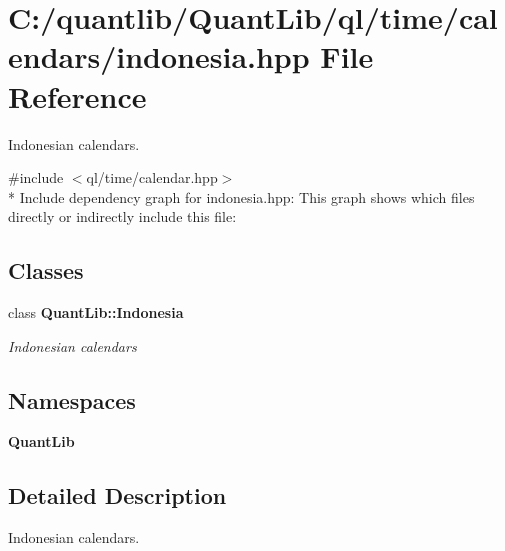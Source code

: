 \section{C\+:/quantlib/\+Quant\+Lib/ql/time/calendars/indonesia.hpp File Reference}
\label{indonesia_8hpp}


Indonesian calendars.  


{\ttfamily \#include $<$ql/time/calendar.\+hpp$>$}\\*
Include dependency graph for indonesia.\+hpp\+:
This graph shows which files directly or indirectly include this file\+:
\subsection*{Classes}
\begin{DoxyCompactItemize}
\item 
class {\bf Quant\+Lib\+::\+Indonesia}
\begin{DoxyCompactList}\small\item\em Indonesian calendars \end{DoxyCompactList}\end{DoxyCompactItemize}
\subsection*{Namespaces}
\begin{DoxyCompactItemize}
\item 
 {\bf Quant\+Lib}
\end{DoxyCompactItemize}


\subsection{Detailed Description}
Indonesian calendars. 

